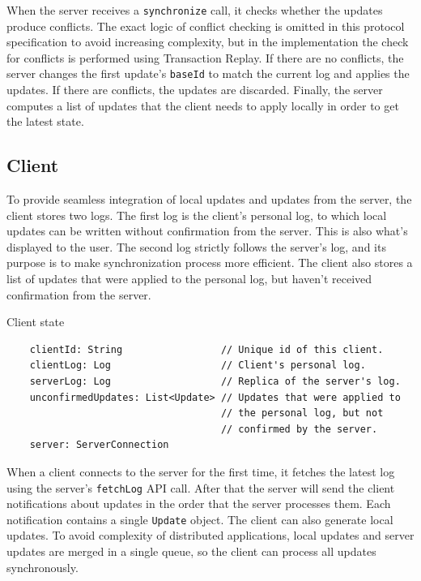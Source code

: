 \documentclass[a4paper, 11pt, oneside]{article}
\theoremstyle{definition}
\begin{document}
When the server receives a \verb|synchronize| call, it checks whether the updates produce conflicts. The exact logic of conflict checking is omitted in this protocol specification to avoid increasing complexity, but in the implementation the check for conflicts is performed using Transaction Replay. If there are no conflicts, the server changes the first update's \verb|baseId| to match the current log and applies the updates. If there are conflicts, the updates are discarded. Finally, the server computes a list of updates that the client needs to apply locally in order to get the latest state.

\subsection{Client}

To provide seamless integration of local updates and updates from the server, the client stores two logs. The first log is the client's personal log, to which local updates can be written without confirmation from the server. This is also what's displayed to the user. The second log strictly follows the server's log, and its purpose is to make synchronization process more efficient. The client also stores a list of updates that were applied to the personal log, but haven't received confirmation from the server.

\begin{algorithm}
    \caption{Client state}\label{alg:client-state}
    \begin{verbatim}
    clientId: String                 // Unique id of this client.
    clientLog: Log                   // Client's personal log.
    serverLog: Log                   // Replica of the server's log.
    unconfirmedUpdates: List<Update> // Updates that were applied to 
                                     // the personal log, but not
                                     // confirmed by the server.
    server: ServerConnection
    \end{verbatim}
\end{algorithm}

When a client connects to the server for the first time, it fetches the latest log using the server's \verb|fetchLog| API call. After that the server will send the client notifications about updates in the order that the server processes them. Each notification contains a single \verb|Update| object. The client can also generate local updates. To avoid complexity of distributed applications, local updates and server updates are merged in a single queue, so the client can process all updates synchronously.
\end{document}
